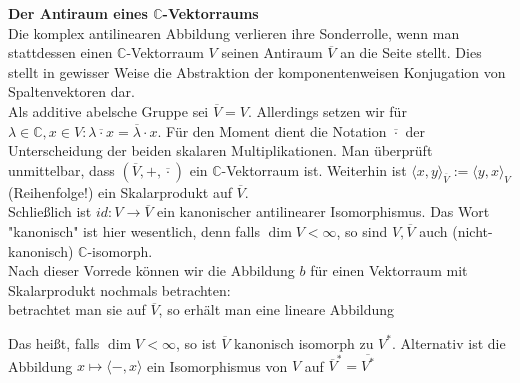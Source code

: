 \documentclass[12pt,a4paper]{article}
\theoremstyle{definition}
\theoremstyle{remark}
\renewcommand{\bar}[1]{\overline{#1}}
\begin{document}
	\textbf{Der Antiraum eines $\mathbb{C}$-Vektorraums} \\
	Die komplex antilinearen Abbildung verlieren ihre Sonderrolle, wenn man stattdessen einen $\mathbb{C}$-Vektorraum $V$ seinen Antiraum $\bar{V}$ an die Seite stellt. Dies stellt in gewisser Weise die Abstraktion der komponentenweisen Konjugation von Spaltenvektoren dar. \\
	Als additive abelsche Gruppe sei $\bar{V} = V$. Allerdings setzen wir für $\lambda \in \mathbb{C}, x \in V: \lambda \bar{\cdot} x = \bar{\lambda} \cdot x$. Für den Moment dient die Notation $\bar{\cdot}$ der Unterscheidung der beiden skalaren Multiplikationen. Man überprüft unmittelbar, dass $(\bar{V}, +, \bar{\cdot})$ ein $\mathbb{C}$-Vektorraum ist. Weiterhin ist $\langle x,y \rangle_{\bar{V}}:= \langle y,x \rangle_V$(Reihenfolge!) ein Skalarprodukt auf $\bar{V}$. \\
	Schließlich ist $id : V \rightarrow \bar{V}$ ein kanonischer antilinearer Isomorphismus. Das Wort "kanonisch" ist hier wesentlich, denn falls $\dim V < \infty$, so sind $V, \bar{V}$ auch (nicht-kanonisch) $\mathbb{C}$-isomorph. \\
	Nach dieser Vorrede können wir die Abbildung $b$ für einen Vektorraum mit Skalarprodukt nochmals betrachten: \\
	betrachtet man sie auf $\bar{V}$, so erhält man eine lineare Abbildung
	\begin{center}
	\end{center}
	Das heißt, falls $\dim V < \infty$, so ist $\bar{V}$ kanonisch isomorph zu $V^*$. Alternativ ist die Abbildung $x \mapsto \langle -,x \rangle$ ein Isomorphismus von $V$ auf $\bar{V}^* = \bar{V^*}$
\end{document}
